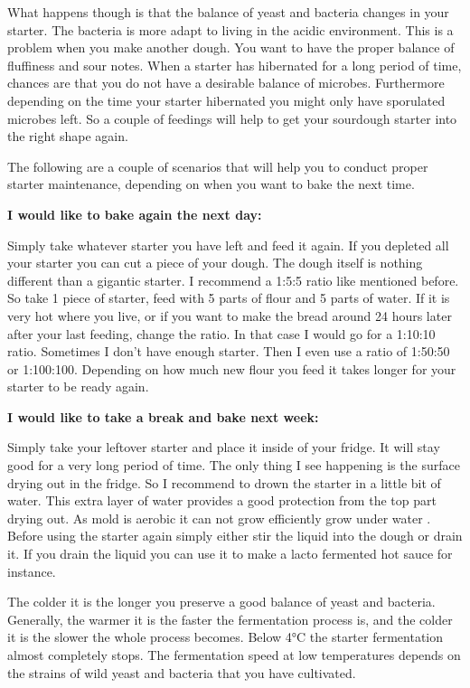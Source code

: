 What happens though is that the balance of yeast and
bacteria changes in your starter. The bacteria is more adapt to living
in the acidic environment. This is a problem when you make another dough.
You want to have the proper balance of fluffiness and sour notes.
When a starter has hibernated for a long period
of time, chances are that you do not have a desirable balance of microbes.
Furthermore depending on the time your starter hibernated you might only have
sporulated microbes left. So a couple of feedings will help to get your
sourdough starter into the right shape again.

The following are a couple of scenarios that will help you to conduct proper
starter maintenance, depending on when you want to bake the next time.

\textbf{I would like to bake again the next day:}

Simply take whatever starter you have left and feed it again. If you depleted
all your starter you can cut a piece of your dough. The dough itself is
nothing different than a gigantic starter. I recommend a 1:5:5 ratio like
mentioned before. So take 1 piece of starter, feed with 5 parts of flour and 5
parts of water. If it is very hot where you live, or if you want to make the
bread around 24 hours later after your last feeding, change the ratio. In that
case I would go for a 1:10:10 ratio. Sometimes I don't have enough starter.
Then I even use a ratio of 1:50:50 or 1:100:100. Depending on how much new
flour you feed it takes longer for your starter to be ready again.

\textbf{I would like to take a break and bake next week:}

Simply take your leftover starter and place it inside of your fridge. It will stay good
for a very long period of time. The only thing I see happening is the surface
drying out in the fridge. So I recommend to drown the starter in a little bit
of water. This extra layer of water provides a good protection from the top
part drying out. As mold is aerobic it can not grow efficiently grow under
water \cite{mold+anaerobic}. Before using the starter again simply either stir
the liquid into the dough or drain it. If you drain the liquid you can use it
to make a lacto fermented hot sauce for instance.

The colder it is the longer you preserve a good balance of yeast and
bacteria. Generally, the warmer it is the faster the fermentation process is, 
and the colder it is the slower the whole process becomes.
Below 4°C the starter fermentation almost completely stops. The
fermentation speed at low temperatures depends on the
strains of wild yeast and bacteria
that you have cultivated.


